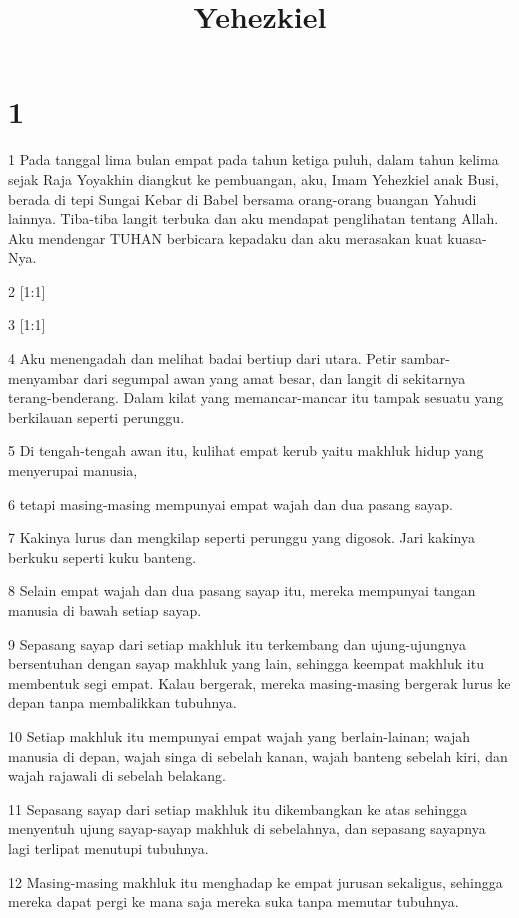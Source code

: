 

\title{Yehezkiel}


\chapter{1}

\par 1 Pada tanggal lima bulan empat pada tahun ketiga puluh, dalam tahun kelima sejak Raja Yoyakhin diangkut ke pembuangan, aku, Imam Yehezkiel anak Busi, berada di tepi Sungai Kebar di Babel bersama orang-orang buangan Yahudi lainnya. Tiba-tiba langit terbuka dan aku mendapat penglihatan tentang Allah. Aku mendengar TUHAN berbicara kepadaku dan aku merasakan kuat kuasa-Nya.
\par 2 [1:1]
\par 3 [1:1]
\par 4 Aku menengadah dan melihat badai bertiup dari utara. Petir sambar-menyambar dari segumpal awan yang amat besar, dan langit di sekitarnya terang-benderang. Dalam kilat yang memancar-mancar itu tampak sesuatu yang berkilauan seperti perunggu.
\par 5 Di tengah-tengah awan itu, kulihat empat kerub yaitu makhluk hidup yang menyerupai manusia,
\par 6 tetapi masing-masing mempunyai empat wajah dan dua pasang sayap.
\par 7 Kakinya lurus dan mengkilap seperti perunggu yang digosok. Jari kakinya berkuku seperti kuku banteng.
\par 8 Selain empat wajah dan dua pasang sayap itu, mereka mempunyai tangan manusia di bawah setiap sayap.
\par 9 Sepasang sayap dari setiap makhluk itu terkembang dan ujung-ujungnya bersentuhan dengan sayap makhluk yang lain, sehingga keempat makhluk itu membentuk segi empat. Kalau bergerak, mereka masing-masing bergerak lurus ke depan tanpa membalikkan tubuhnya.
\par 10 Setiap makhluk itu mempunyai empat wajah yang berlain-lainan; wajah manusia di depan, wajah singa di sebelah kanan, wajah banteng sebelah kiri, dan wajah rajawali di sebelah belakang.
\par 11 Sepasang sayap dari setiap makhluk itu dikembangkan ke atas sehingga menyentuh ujung sayap-sayap makhluk di sebelahnya, dan sepasang sayapnya lagi terlipat menutupi tubuhnya.
\par 12 Masing-masing makhluk itu menghadap ke empat jurusan sekaligus, sehingga mereka dapat pergi ke mana saja mereka suka tanpa memutar tubuhnya.
